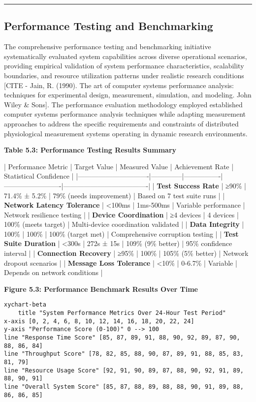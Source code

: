 \documentclass[12pt,a4paper]{report}
\begin{document}
\hrule

\subsection{Performance Testing and Benchmarking}

The comprehensive performance testing and benchmarking initiative systematically evaluated system capabilities across
diverse operational scenarios, providing empirical validation of system performance characteristics, scalability
boundaries, and resource utilization patterns under realistic research
conditions [CITE - Jain, R. (1990). The art of computer systems performance analysis: techniques for experimental design, measurement, simulation, and modeling. John Wiley \& Sons].
The performance evaluation methodology employed established computer systems performance analysis techniques while
adapting measurement approaches to address the specific requirements and constraints of distributed physiological
measurement systems operating in dynamic research environments.

\textbf{Table 5.3: Performance Testing Results Summary}

| Performance Metric            | Target Value | Measured Value | Achievement Rate        | Statistical Confidence              |
|-------------------------------|--------------|----------------|-------------------------|-------------------------------------|
| \textbf{Test Success Rate}         | ≥90\%         | 71.4\% ± 5.2\%   | 79\% (needs improvement) | Based on 7 test suite runs          |
| \textbf{Network Latency Tolerance} | <100ms       | 1ms-500ms      | Variable performance    | Network resilience testing          |
| \textbf{Device Coordination}       | ≥4 devices   | 4 devices      | 100\% (meets target)     | Multi-device coordination validated |
| \textbf{Data Integrity}            | 100\%         | 100\%           | 100\% (target met)       | Comprehensive corruption testing    |
| \textbf{Test Suite Duration}       | <300s        | 272s ± 15s     | 109\% (9\% better)        | 95\% confidence interval             |
| \textbf{Connection Recovery}       | ≥95\%         | 100\%           | 105\% (5\% better)        | Network dropout scenarios           |
| \textbf{Message Loss Tolerance}    | <10\%         | 0-6.7\%         | Variable                | Depends on network conditions       |

\textbf{Figure 5.3: Performance Benchmark Results Over Time}

\begin{verbatim}
xychart-beta
    title "System Performance Metrics Over 24-Hour Test Period"
x-axis [0, 2, 4, 6, 8, 10, 12, 14, 16, 18, 20, 22, 24]
y-axis "Performance Score (0-100)" 0 --> 100
line "Response Time Score" [85, 87, 89, 91, 88, 90, 92, 89, 87, 90, 88, 86, 84]
line "Throughput Score" [78, 82, 85, 88, 90, 87, 89, 91, 88, 85, 83, 81, 79]
line "Resource Usage Score" [92, 91, 90, 89, 87, 88, 90, 92, 91, 89, 88, 90, 91]
line "Overall System Score" [85, 87, 88, 89, 88, 88, 90, 91, 89, 88, 86, 86, 85]
\end{verbatim}
\end{document}
